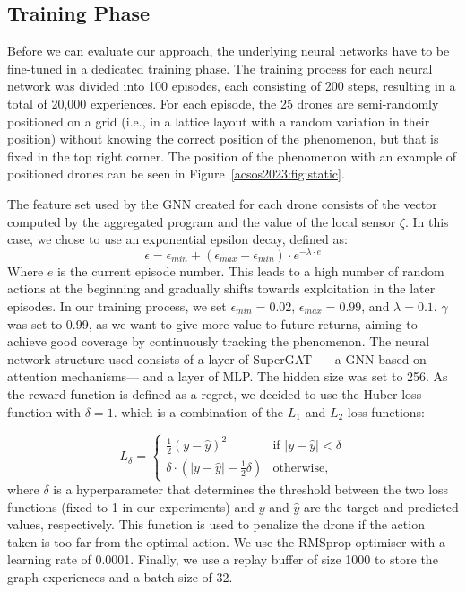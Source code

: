 \subsection{Training Phase}
Before we can evaluate our approach, the underlying neural networks have to be fine-tuned in a dedicated training phase.
The training process for each neural network was divided into 100 episodes, each consisting of 200 steps, resulting in a total of 20,000 experiences.
%
For each episode, 
 the 25 drones are semi-randomly positioned on a grid (i.e., in a lattice layout with a random variation in their position) without knowing the correct position of the phenomenon, 
 but that is fixed in the top right corner. 
 The position of the phenomenon with an example of positioned drones can be seen in Figure~\ref{acsos2023:fig:static}. 

 The feature set used by the \ac{GNN} created for each drone consists of the vector computed by the aggregated program and the value of the local sensor $\zeta$.
%
In this case, we chose to use an exponential epsilon decay, defined as:
$$\epsilon = \epsilon_{min} + (\epsilon_{max} - \epsilon_{min}) \cdot e^{-\lambda \cdot e}$$
Where $e$ is the current episode number. 
This leads to a high number of random actions at the beginning and gradually shifts towards exploitation in the later episodes. 
%
In our training process, 
 we set $\epsilon_{min} = 0.02$, $\epsilon_{max} = 0.99$, and $\lambda = 0.1$.
$\gamma$ was set to 0.99, 
 as we want to give more value to future returns, 
 aiming to achieve good coverage by continuously tracking the phenomenon. 
The neural network structure used consists of a layer of SuperGAT~\cite{DBLP:journals/corr/abs-2204-04879} ---a \ac{GNN} based on attention mechanisms--- and a layer of MLP. 
The hidden size was set to 256.
%
As the reward function is defined as a regret, 
 we decided to use the Huber loss function with $\delta = 1$. %
 which is a combination of the $L_1$ and $L_2$ loss functions:

\begin{equation*}
L_\delta = \begin{cases}
  \frac{1}{2} (y - \hat{y})^2 & \text{if } |y - \hat{y}| < \delta \\
  \delta \cdot (|y - \hat{y}| - \frac{1}{2} \delta) & \text{otherwise,} 
 \end{cases}
\end{equation*}
where $\delta$ is a hyperparameter that determines the threshold between the two loss functions (fixed to 1 in our experiments) and $y$ and $\hat{y}$ are the target and predicted values, respectively.
This function is used to penalize the drone if the action taken is too far from the optimal action. 
%
We use the RMSprop optimiser with a learning rate of 0.0001.
%
Finally, we use a replay buffer of size 1000 to store the graph experiences and a batch size of 32.
